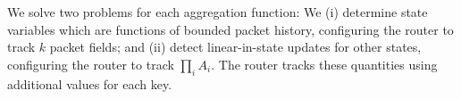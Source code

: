 
We solve two problems for each aggregation function: We (i) determine state
variables which are functions of bounded packet history, configuring the router
to track $k$ packet fields; and (ii) detect linear-in-state updates for other
states, configuring the router to track $\prod_{i} A_i$. The router tracks
these quantities using additional values for each key.





